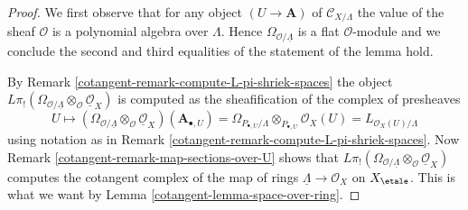 \begin{proof}

We first observe that for any object $(U \to \mathbf{A})$ of
$\mathcal{C}_{X/\Lambda}$
the value of the sheaf $\mathcal{O}$ is a polynomial algebra over $\Lambda$.
Hence $\Omega_{\mathcal{O}/\underline{\Lambda}}$ is a flat $\mathcal{O}$-module
and we conclude the second and third equalities of the statement of the
lemma hold.

\medskip\noindent
By Remark \ref{cotangent-remark-compute-L-pi-shriek-spaces} the object
$L\pi_!(\Omega_{\mathcal{O}/\underline{\Lambda}}
\otimes_\mathcal{O} \underline{\mathcal{O}}_X)$
is computed as the sheafification of the complex of presheaves
$$
U \mapsto
\left(\Omega_{\mathcal{O}/\underline{\Lambda}}
\otimes_\mathcal{O} \underline{\mathcal{O}}_X\right)(\mathbf{A}_{\bullet, U})
=
\Omega_{P_{\bullet, U}/\Lambda} \otimes_{P_{\bullet, U}} \mathcal{O}_X(U) =
L_{\mathcal{O}_X(U)/\Lambda}
$$
using notation as in Remark \ref{cotangent-remark-compute-L-pi-shriek-spaces}.
Now Remark \ref{cotangent-remark-map-sections-over-U} shows that
$L\pi_!(\Omega_{\mathcal{O}/\underline{\Lambda}}
\otimes_\mathcal{O} \underline{\mathcal{O}}_X)$
computes the cotangent complex of the map of rings
$\underline{\Lambda} \to \mathcal{O}_X$ on $X_\etale$.
This is what we want by Lemma \ref{cotangent-lemma-space-over-ring}.
\end{proof}

